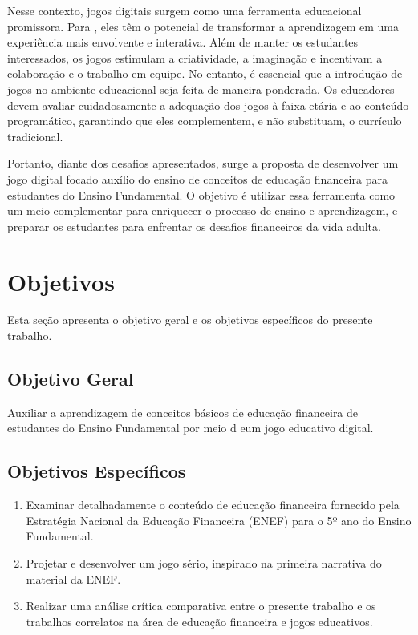 Nesse contexto, jogos digitais surgem como uma ferramenta educacional promissora. Para \cite{Cruz_Araujo_Andrye_Galvao_Madeira_2022}, eles têm o potencial de transformar a aprendizagem em uma experiência mais envolvente e interativa. Além de manter os estudantes interessados, os jogos estimulam a criatividade, a imaginação e incentivam a colaboração e o trabalho em equipe. No entanto, é essencial que a introdução de jogos no ambiente educacional seja feita de maneira ponderada. Os educadores devem avaliar cuidadosamente a adequação dos jogos à faixa etária e ao conteúdo programático, garantindo que eles complementem, e não substituam, o currículo tradicional.

Portanto, diante dos desafios apresentados, surge a proposta de desenvolver um jogo digital focado auxílio do ensino de conceitos de educação financeira para estudantes do Ensino Fundamental. O objetivo é utilizar essa ferramenta como um meio complementar para enriquecer o processo de ensino e aprendizagem, e preparar os estudantes para enfrentar os desafios financeiros da vida adulta.

\section{Objetivos}
Esta seção apresenta o objetivo geral e os objetivos específicos do presente trabalho.

\subsection{Objetivo Geral}
Auxiliar a aprendizagem de conceitos básicos de educação financeira de estudantes do Ensino Fundamental por meio d eum jogo educativo digital.

\subsection{Objetivos Específicos}
\begin{enumerate}[noitemsep,nosep,labelindent=\parindent,leftmargin=*,label={\alph*}) ]
	\item Examinar detalhadamente o conteúdo de educação financeira fornecido pela Estratégia Nacional da Educação Financeira (ENEF) para o 5º ano do Ensino Fundamental.
	\item Projetar e desenvolver um jogo sério, inspirado na primeira narrativa do material da ENEF.
	\item Realizar uma análise crítica comparativa entre o presente trabalho e os trabalhos correlatos na área de educação financeira e jogos educativos.
\end{enumerate}


